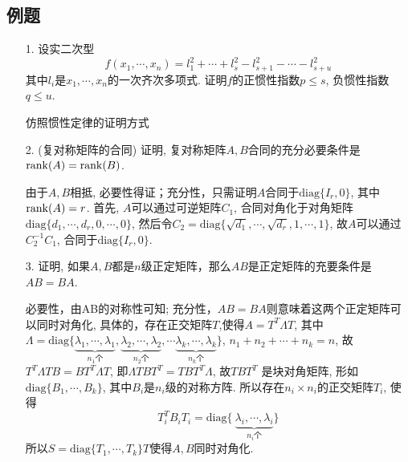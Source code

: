 \subsection*{例题}
\begin{itemize}
	\item[1.] 设实二次型$$f(x_1, \cdots, x_n) = l_1^2 + \cdots + l_s^2 - l_{s+1}^2 - \cdots - l_{s+u}^2$$
	其中$l_i$是$x_1,\cdots,x_n$的一次齐次多项式. 证明$f$的正惯性指数$p \le s$, 负惯性指数$q \le u$.
	\begin{solution}
		仿照惯性定律的证明方式
	\end{solution}
	\vspace{2cm}

	\item[2.] (复对称矩阵的合同) 证明, 复对称矩阵$A,B$合同的充分必要条件是$\mathrm{rank}(A) = \mathrm{rank}(B)$.
	\begin{solution}
		由于$A,B$相抵, 必要性得证；充分性，只需证明$A$合同于$\mathrm{diag}\{I_r, 0\}$,
		其中$\mathrm{rank}(A) = r$. 首先, $A$可以通过可逆矩阵$C_1$, 合同对角化于对角矩阵$\mathrm{diag}\{d_1,\cdots, d_r,0,\cdots,0\}$,
		然后令$C_2 = \mathrm{diag}\{\sqrt{d_1}, \cdots, \sqrt{d_r}, 1, \cdots, 1\}$, 
		故$A$可以通过$C_2^{-1}C_1$, 合同于$\mathrm{diag}\{I_r, 0\}$.
	\end{solution}
	\vspace{2cm}

	\item[3.] 证明, 如果$A,B$都是$n$级正定矩阵，那么$AB$是正定矩阵的充要条件是$AB=BA$.
	\begin{solution}
		必要性，由AB的对称性可知; 充分性，$AB=BA$则意味着这两个正定矩阵可以同时对角化,
		具体的，存在正交矩阵$T$,使得$A = T^T \Lambda T$, 
		其中$\Lambda = 
		\mathrm{diag}\{
			\underbrace{\lambda_{1},\cdots,\lambda_{1}}_{n_1 \text{个}},
			\underbrace{\lambda_{2},\cdots,\lambda_{2}}_{n_2 \text{个}},
			\cdots
			\underbrace{\lambda_{k},\cdots,\lambda_{k}}_{n_k \text{个}}
		\}$,
		$n_1 + n_2 + \cdots + n_k = n$,
		故$T^T \Lambda T B = B T^T \Lambda T$,
		即$\Lambda T B T^T = T B T^T \Lambda $, 故$TB T^T$
		是块对角矩阵, 形如$\mathrm{diag}\{B_1, \cdots, B_k\}$, 其中$B_i$是$n_i$级的对称方阵.
		所以存在$n_i \times n_i$的正交矩阵$T_i$, 使得
		\begin{equation}\nonumber
		T_i^T B_i T_i = \mathrm{diag}\{\ \underbrace{\lambda_i, \cdots, \lambda_i}_{n_i \text{个}}\}
		\end{equation}
		所以$S = \mathrm{diag}\{T_1, \cdots, T_k\} T$使得$A,B$同时对角化.
	\end{solution}
	\vspace{2cm}


\end{itemize}
